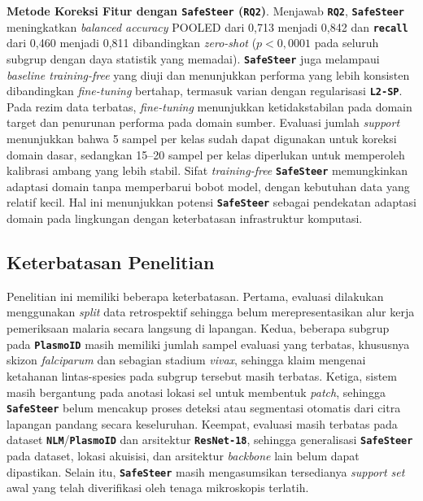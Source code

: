 \documentclass[conference]{IEEEtran}
\newcommand{\nama}[1]{\textbf{\texttt{#1}}}
\newcommand{\myparagraph}[1]{\vspace{0.2cm}\noindent\textbf{#1}.}
\begin{document}
\myparagraph{Metode Koreksi Fitur dengan \nama{SafeSteer} (\nama{RQ2})}
Menjawab \nama{RQ2}, \nama{SafeSteer} meningkatkan \textit{balanced accuracy} POOLED dari 0,713 menjadi 0,842 dan \nama{recall} dari 0,460 menjadi 0,811 dibandingkan \textit{zero-shot} ($p<0{,}0001$ pada seluruh subgrup dengan daya statistik yang memadai). \nama{SafeSteer} juga melampaui \textit{baseline training-free} yang diuji dan menunjukkan performa yang lebih konsisten dibandingkan \textit{fine-tuning} bertahap, termasuk varian dengan regularisasi \nama{L2-SP}. Pada rezim data terbatas, \textit{fine-tuning} menunjukkan ketidakstabilan pada domain target dan penurunan performa pada domain sumber. Evaluasi jumlah \textit{support} menunjukkan bahwa 5 sampel per kelas sudah dapat digunakan untuk koreksi domain dasar, sedangkan 15--20 sampel per kelas diperlukan untuk memperoleh kalibrasi ambang yang lebih stabil.
Sifat \textit{training-free} \nama{SafeSteer} memungkinkan adaptasi domain tanpa memperbarui bobot model, dengan kebutuhan data yang relatif kecil. Hal ini menunjukkan potensi \nama{SafeSteer} sebagai pendekatan adaptasi domain pada lingkungan dengan keterbatasan infrastruktur komputasi.

\subsection{Keterbatasan Penelitian}
Penelitian ini memiliki beberapa keterbatasan. Pertama, evaluasi dilakukan menggunakan \textit{split} data retrospektif sehingga belum merepresentasikan alur kerja pemeriksaan malaria secara langsung di lapangan. Kedua, beberapa subgrup pada \nama{PlasmoID} masih memiliki jumlah sampel evaluasi yang terbatas, khususnya skizon \textit{falciparum} dan sebagian stadium \textit{vivax}, sehingga klaim mengenai ketahanan lintas-spesies pada subgrup tersebut masih terbatas. Ketiga, sistem masih bergantung pada anotasi lokasi sel untuk membentuk \textit{patch}, sehingga \nama{SafeSteer} belum mencakup proses deteksi atau segmentasi otomatis dari citra lapangan pandang secara keseluruhan. Keempat, evaluasi masih terbatas pada dataset \nama{NLM}/\nama{PlasmoID} dan arsitektur \nama{ResNet-18}, sehingga generalisasi \nama{SafeSteer} pada dataset, lokasi akuisisi, dan arsitektur \textit{backbone} lain belum dapat dipastikan. Selain itu, \nama{SafeSteer} masih mengasumsikan tersedianya \textit{support set} awal yang telah diverifikasi oleh tenaga mikroskopis terlatih.
\end{document}
